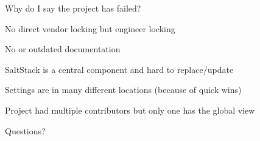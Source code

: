 \documentclass[aspectratio=169]{beamer}
\begin{document}

\begin{frame}{Why do I say the project has failed?}

  \begin{vfilleditems}
    \item No direct vendor locking but engineer locking
    \item No or outdated documentation
    \item SaltStack is a central component and hard to replace/update
    \item Settings are in many different locations (because of quick wins)
    \item Project had multiple contributors but only one has the global view
  \end{vfilleditems}

\end{frame}


{
  \begin{frame}[plain,c]
    \begin{center}
      \Huge \color[rgb]{1,1,1}Questions?
    \end{center}
  \end{frame}
}
\end{document}
